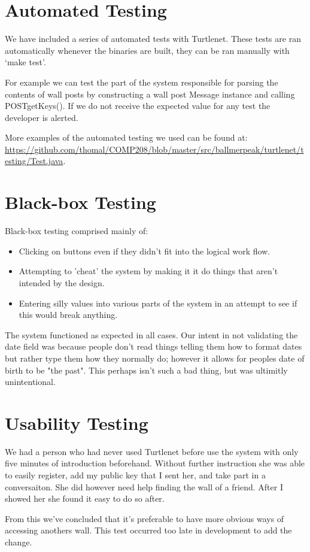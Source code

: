 \section{Automated Testing}
We have included a series of automated tests with Turtlenet. These tests are
ran automatically whenever the binaries are built, they can be ran manually with
`make test'.\par

For example we can test the part of the system responsible for parsing the
contents of wall posts by constructing a wall post Message instance and calling
POSTgetKeys(). If we do not receive the expected value for any test the
developer is alerted. \par

More examples of the automated testing we used can be found at:
\url{https://github.com/thomal/COMP208/blob/master/src/ballmerpeak/turtlenet/testing/Test.java}.

\section{Black-box Testing}
Black-box testing comprised mainly of:

\begin{itemize}
    \item Clicking on buttons even if they didn't fit into the logical work flow.
    \item Attempting to 'cheat' the system by making it it do things that aren't intended by the design.
    \item Entering silly values into various parts of the system in an attempt to see if this would break anything.
\end{itemize}

The system functioned as expected in all cases. Our intent in not validating the
date field was because people don't read things telling them how to format dates
but rather type them how they normally do; however it allows for peoples date of
birth to be "the past". This perhaps isn't such a bad thing, but was ultimitly
unintentional.

\section{Usability Testing}
We had a person who had never used Turtlenet before use the system with only
five minutes of introduction beforehand. Without further instruction she was
able to easily register, add my public key that I sent her, and take part in a
conversaiton. She did however need help finding the wall of a friend. After I
showed her she found it easy to do so after.


From this we've concluded that it's preferable to have more obvious ways of
accessing anothers wall. This test occurred too late in development to add the
change.

